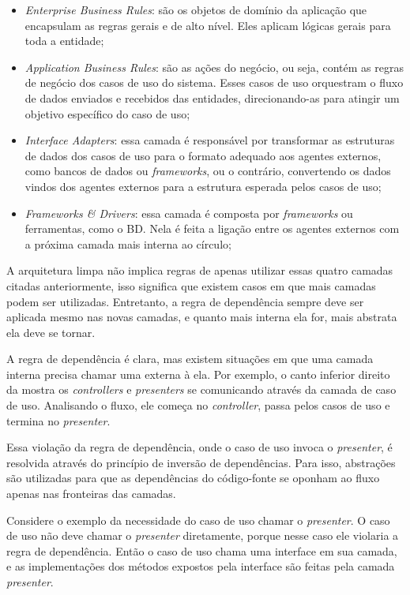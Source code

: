 \begin{itemize}
    \item \textit{Enterprise Business Rules}: são os objetos de domínio da aplicação que encapsulam as regras gerais e de alto nível. Eles aplicam lógicas gerais para toda a entidade;
    \item \textit{Application Business Rules}: são as ações do negócio, ou seja, contém as regras de negócio dos casos de uso do sistema. Esses casos de uso orquestram o fluxo de dados enviados e recebidos das entidades, direcionando-as para atingir um objetivo específico do caso de uso;
    \item \textit{Interface Adapters}: essa camada é responsável por transformar as estruturas de dados dos casos de uso para o formato adequado aos agentes externos, como bancos de dados ou \textit{frameworks}, ou o contrário, convertendo os dados vindos dos agentes externos para a estrutura esperada pelos casos de uso;
    \item \textit{Frameworks \& Drivers}: essa camada é composta por \textit{frameworks} ou ferramentas, como o BD. Nela é feita a ligação entre os agentes externos com a próxima camada mais interna ao círculo;
\end{itemize}

A arquitetura limpa não implica regras de apenas utilizar essas quatro camadas citadas anteriormente, isso significa que existem casos em que mais camadas podem ser utilizadas. Entretanto, a regra de dependência sempre deve ser aplicada mesmo nas novas camadas, e quanto mais interna ela for, mais abstrata ela deve se tornar.

A regra de dependência é clara, mas existem situações em que uma camada interna precisa chamar uma externa à ela. Por exemplo, o canto inferior direito da  mostra os \textit{controllers} e \textit{presenters} se comunicando através da camada de caso de uso. Analisando o fluxo, ele começa no \textit{controller}, passa pelos casos de uso e termina no \textit{presenter}.

Essa violação da regra de dependência, onde o caso de uso invoca o \textit{presenter}, é resolvida através do princípio de inversão de dependências. Para isso, abstrações são utilizadas para que as dependências do código-fonte se oponham ao fluxo apenas nas fronteiras das camadas.

Considere o exemplo da necessidade do caso de uso chamar o \textit{presenter}. O caso de uso não deve chamar o \textit{presenter} diretamente, porque nesse caso ele violaria a regra de dependência. Então o caso de uso chama uma interface em sua camada, e as implementações dos métodos expostos pela interface são feitas pela camada \textit{presenter}.

